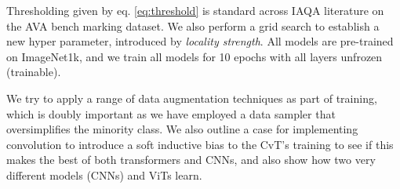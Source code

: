 Thresholding given by eq. \ref{eq:threshold} is standard across IAQA literature on the AVA bench marking dataset. We also perform a grid search to establish a new hyper parameter, introduced by \cite{DAscoli2021} \textit{locality strength}. All models are pre-trained on ImageNet1k, and we train all models for 10 epochs with all layers unfrozen (trainable).

We try to apply a range of data augmentation techniques as part of training, which is doubly important as we have employed a data sampler that oversimplifies the minority class. We also outline a case for implementing convolution to introduce a soft inductive bias to the CvT's training to see if this makes the best of both transformers and CNNs, and also show how two very different models (CNNs) and ViTs learn.